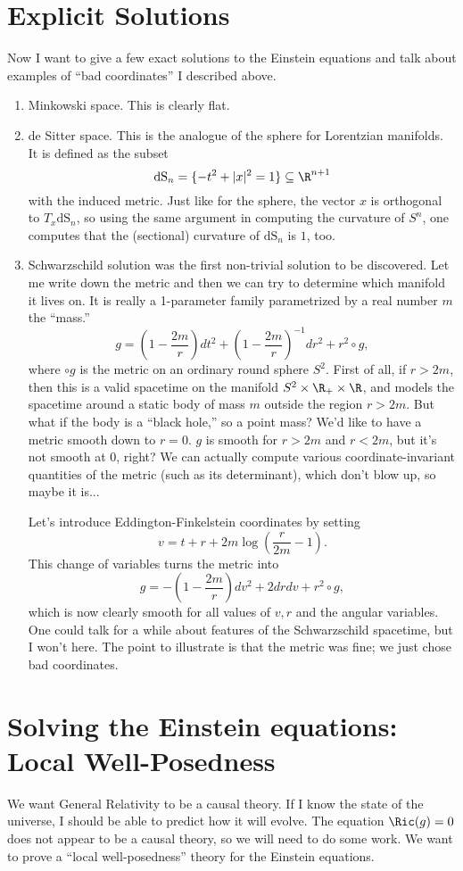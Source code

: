 \documentclass[12pt]{article}
\begin{document}
\section{Explicit Solutions}
Now I want to give a few exact solutions to the Einstein equations and talk about examples of  ``bad coordinates'' I described above.
\begin{enumerate}
\item Minkowski space. This is clearly flat.
\item de Sitter space. This is the analogue of the sphere for Lorentzian manifolds. It is defined as the subset
\[\text{dS}_{n} = \{-t^2 + |x|^2 = 1\} \subseteq \R^{n+1}\] with the induced metric. Just like for the sphere, the vector $x$ is orthogonal to $T_x\text{dS}_n$, so using the same argument in computing the curvature of $S^n$, one computes that the (sectional) curvature of $\text{dS}_n$ is $1$, too.
\item Schwarzschild solution was the first non-trivial solution to be discovered. Let me write down the metric and then we can try to determine which manifold it lives on. It is really a 1-parameter family parametrized by a real number $m$ the ``mass.''
\[g = \left(1-\frac{2m}{r}\right)dt^2 + \left(1-\frac{2m}{r}\right)^{-1}dr^2 + r^2\circ{g},\]
where $\circ{g}$ is the metric on an ordinary round sphere $S^2$.
First of all, if $r > 2m$, then this is a valid spacetime on the manifold $S^2\times \R_+ \times \R$, and models the spacetime around a static body of mass $m$ outside the region $r > 2m$. But what if the body is a ``black hole,'' so a point mass? We'd like to have a metric smooth down to $r = 0$. $g$ is smooth for $r > 2m$ and $r < 2m$, but it's not smooth at $0$, right? We can actually compute various coordinate-invariant quantities of the metric (such as its determinant), which don't blow up, so maybe it is...

Let's introduce Eddington-Finkelstein coordinates by setting
\[v = t+r+2m\log\left(\frac{r}{2m}-1\right).\] This change of variables turns the metric into
\[g = -\left(1-\frac{2m}{r}\right)dv^2 + 2drdv + r^2\circ{g},\]
which is now clearly smooth for all values of $v,r$ and the angular variables. One could talk for a while about features of the Schwarzschild spacetime, but I won't here. The point to illustrate is that the metric was fine; we just chose bad coordinates.\end{enumerate}

\section{Solving the Einstein equations: Local Well-Posedness}
We want General Relativity to be a causal theory. If I know the state of the universe, I should be able to predict how it will evolve. The equation $\Ric(g) = 0$ does not appear to be a causal theory, so we will need to do some work. We want to prove a ``local well-posedness'' theory for the Einstein equations.
\end{document}
